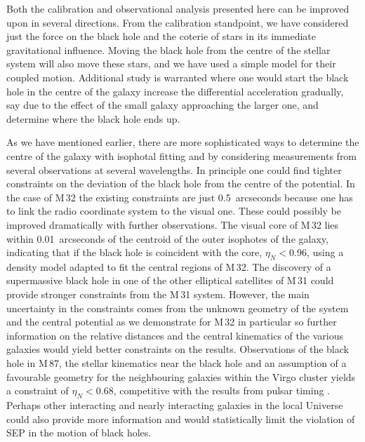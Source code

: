 \documentclass[useAMS,usenatbib]{mn2e}
\begin{document}
Both the calibration and observational analysis presented here can be
improved upon in several directions.  From the calibration standpoint,
we have 
considered
just the force on the black hole and the coterie
of stars in its immediate gravitational influence.  Moving the black
hole from the centre of the stellar system will also move these stars,
and we have used a simple model for their coupled motion.
Additional study is warranted where one would start the black hole
in the centre of the galaxy increase the differential acceleration gradually,
say due to the effect of the small galaxy 
approaching 
the larger one, and determine where the black hole ends up.

As we have mentioned earlier, there are more sophisticated ways to
determine the centre of the galaxy with isophotal fitting and by
considering measurements from several observations at several
wavelengths.  In 
principle 
one could find tighter constraints on the deviation of the black hole
from the centre of the potential.  In the case of M\,32 the existing
constraints are just 0.5~arcseconds because one has to link the radio
coordinate system to the visual one.  These could possibly be improved
dramatically with further observations.  The visual core of M\,32 lies
within 0.01~arcseconds of the centroid of the outer isophotes of the
galaxy, indicating that if the black hole is coincident with the core,
$\eta_N<0.96$, using a density model adapted to fit the central
regions of M\,32.  The discovery of a supermassive black hole in one
of the other elliptical satellites of M\,31 could provide stronger
constraints from the M\,31 system.  However, the main uncertainty in
the constraints comes from the unknown geometry of the system and the
central potential as we demonstrate for M\,32 in particular so further
information on the relative distances and the central kinematics of
the various galaxies would yield better constraints on the results.
Observations of the black hole in M\,87, the stellar kinematics near
the black hole and an assumption of a favourable geometry for the
neighbouring galaxies within the Virgo cluster yields a constraint of
$\eta_N<0.68$, competitive with the results from pulsar timing
\citep{Stairs:2005}.  Perhaps other interacting and nearly interacting
galaxies in the local Universe could also provide more information and
would statistically limit the violation of SEP in the motion of black
holes.
\end{document}
